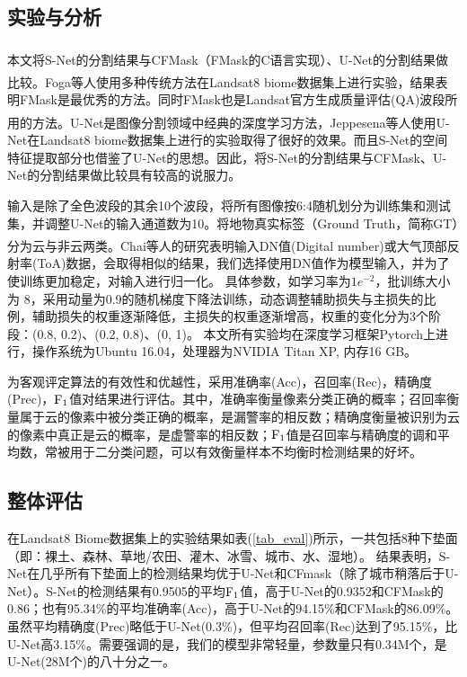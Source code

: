\documentclass[10pt]{ctexart}
\newcommand{\upcite}[1]{\textsuperscript{\textsuperscript{\cite{#1}}}}
\begin{document}
\begin{multicols}{2}
\section[]{实验与分析}

本文将S-Net的分割结果与CFMask（FMask\upcite{zhu2012object}的C语言实现）、U-Net\upcite{ronneberger2015unet}的分割结果做比较。Foga等人\upcite{foga2017cloud_data}使用多种传统方法在Landsat8 biome数据集上进行实验，结果表明FMask是最优秀的方法。同时FMask也是Landsat官方生成质量评估(QA)波段所用的方法。U-Net是图像分割领域中经典的深度学习方法，Jeppesena等人\upcite{jeppesen2019cloud}使用U-Net在Landsat8 biome数据集上进行的实验取得了很好的效果。而且S-Net的空间特征提取部分也借鉴了U-Net的思想。因此，将S-Net的分割结果与CFMask、U-Net的分割结果做比较具有较高的说服力。

输入是除了全色波段的其余10个波段，将所有图像按6:4随机划分为训练集和测试集，并调整U-Net的输入通道数为10。将地物真实标签（Ground Truth，简称GT）分为云与非云两类。Chai等人\upcite{chai2019cloud}的研究表明输入DN值(Digital number)或大气顶部反射率(ToA)数据，会取得相似的结果，我们选择使用DN值作为模型输入，并为了使训练更加稳定，对输入进行归一化。
具体参数，如学习率为$1e^{-2}$，批训练大小为 8，采用动量为0.9的随机梯度下降法训练，动态调整辅助损失与主损失的比例，辅助损失的权重逐渐降低，主损失的权重逐渐增高，权重的变化分为3个阶段：(0.8, 0.2)、(0.2, 0.8)、(0, 1)。
本文所有实验均在深度学习框架Pytorch上进行，操作系统为Ubuntu 16.04，处理器为NVIDIA Titan XP, 内存16 GB。

为客观评定算法的有效性和优越性，采用准确率(Acc)，召回率(Rec)，精确度(Prec)，$\rm F_1$值对结果进行评估。其中，准确率衡量像素分类正确的概率；召回率衡量属于云的像素中被分类正确的概率，是漏警率的相反数；精确度衡量被识别为云的像素中真正是云的概率，是虚警率的相反数；$\rm F_1$值是召回率与精确度的调和平均数，常被用于二分类问题，可以有效衡量样本不均衡时检测结果的好坏。

\subsection{整体评估}
在Landsat8 Biome数据集上的实验结果如表(\ref{tab_eval})所示，一共包括8种下垫面（即：裸土、森林、草地/农田、灌木、冰雪、城市、水、湿地）。
结果表明，S-Net在几乎所有下垫面上的检测结果均优于U-Net和CFmask（除了城市稍落后于U-Net）。S-Net的检测结果有0.9505的平均$\rm F_1$值，高于U-Net的0.9352和CFMask的0.86；也有95.34\%的平均准确率(Acc)，高于U-Net的94.15\%和CFMask的86.09\%。虽然平均精确度(Prec)略低于U-Net(0.3\%)，但平均召回率(Rec)达到了95.15\%，比U-Net高3.15\%。需要强调的是，我们的模型非常轻量，参数量只有0.34M个，是U-Net(28M个)的八十分之一。

\end{multicols}
\end{document}
